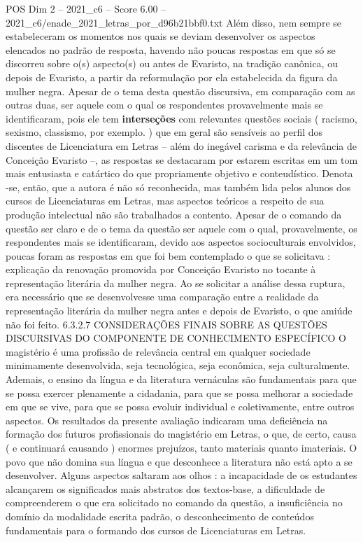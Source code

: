 \begin{textsample}{POS Dim 2 – 2021\_c6 – Score 6.00 – 2021\_c6/enade\_2021\_letras\_por\_d96b21bbf0.txt}
Além disso, nem sempre se estabeleceram os momentos nos quais se deviam desenvolver os aspectos elencados no padrão de resposta, havendo não poucas respostas em que só se discorreu sobre o(s) aspecto(s) ou antes de Evaristo, na tradição canônica, ou depois de Evaristo, a partir da reformulação por ela estabelecida da figura da mulher negra.
Apesar de o tema desta questão discursiva, em comparação com as outras duas, ser aquele com o qual os respondentes provavelmente mais se identificaram, pois ele tem \textbf{interseções} com relevantes questões sociais ( racismo, sexismo, classismo, por exemplo. ) que em geral são sensíveis ao perfil dos discentes de Licenciatura em Letras – além do inegável carisma e da relevância de Conceição Evaristo –, as respostas se destacaram por estarem escritas em um tom mais entusiasta e catártico do que propriamente objetivo e conteudístico.
Denota -se, então, que a autora é não só reconhecida, mas também lida pelos alunos dos cursos de Licenciaturas em Letras, mas aspectos teóricos a respeito de sua produção intelectual não são trabalhados a contento.
Apesar de o comando da questão ser claro e de o tema da questão ser aquele com o qual, provavelmente, os respondentes mais se identificaram, devido aos aspectos socioculturais envolvidos, poucas foram as respostas em que foi bem contemplado o que se solicitava : explicação da renovação promovida por Conceição Evaristo no tocante à representação literária da mulher negra.
Ao se solicitar a análise dessa ruptura, era necessário que se desenvolvesse uma comparação entre a realidade da representação literária da mulher negra antes e depois de Evaristo, o que amiúde não foi feito. 6.3.2.7 CONSIDERAÇÕES FINAIS SOBRE AS QUESTÕES DISCURSIVAS DO COMPONENTE DE CONHECIMENTO ESPECÍFICO O magistério é uma profissão de relevância central em qualquer sociedade minimamente desenvolvida, seja tecnológica, seja econômica, seja culturalmente.
Ademais, o ensino da língua e da literatura vernáculas são fundamentais para que se possa exercer plenamente a cidadania, para que se possa melhorar a sociedade em que se vive, para que se possa evoluir individual e coletivamente, entre outros aspectos.
Os resultados da presente avaliação indicaram uma deficiência na formação dos futuros profissionais do magistério em Letras, o que, de certo, causa ( e continuará causando ) enormes prejuízos, tanto materiais quanto imateriais.
O povo que não domina sua língua e que desconhece a literatura não está apto a se desenvolver.
Alguns aspectos saltaram aos olhos : a incapacidade de os estudantes alcançarem os significados mais abstratos dos textos-base, a dificuldade de compreenderem o que era solicitado no comando da questão, a insuficiência no domínio da modalidade escrita padrão, o desconhecimento de conteúdos fundamentais para o formando dos cursos de Licenciaturas em Letras.

\end{textsample}
